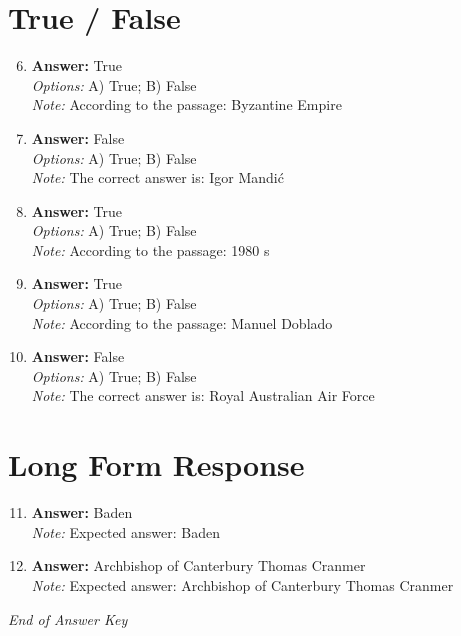 \documentclass[12pt]{article}
\begin{document}
\section*{True / False}
\begin{enumerate}[label=\arabic*.]
\setcounter{enumi}{5}
\item \textbf{Answer:} True
\\ \textit{Options:} A) True; B) False
\\ \textit{Note:} According to the passage: Byzantine Empire
\item \textbf{Answer:} False
\\ \textit{Options:} A) True; B) False
\\ \textit{Note:} The correct answer is: Igor Mandić
\item \textbf{Answer:} True
\\ \textit{Options:} A) True; B) False
\\ \textit{Note:} According to the passage: 1980 s
\item \textbf{Answer:} True
\\ \textit{Options:} A) True; B) False
\\ \textit{Note:} According to the passage: Manuel Doblado
\item \textbf{Answer:} False
\\ \textit{Options:} A) True; B) False
\\ \textit{Note:} The correct answer is: Royal Australian Air Force
\end{enumerate}

\section*{Long Form Response}
\begin{enumerate}[label=\arabic*.]
\setcounter{enumi}{10}
\item \textbf{Answer:} Baden
\\ \textit{Note:} Expected answer: Baden
\item \textbf{Answer:} Archbishop of Canterbury Thomas Cranmer
\\ \textit{Note:} Expected answer: Archbishop of Canterbury Thomas Cranmer
\end{enumerate}

\vfill
\noindent\textit{End of Answer Key}
\end{document}
